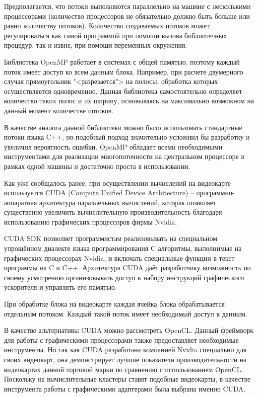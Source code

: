 \documentclass[a4paper, 14pt]{extarticle}
\theoremstyle{definition}
\begin{document}
\par Предполагается, что потоки выполняются параллельно на машине с несколькими процессорами (количество процессоров не обязательно должно быть больше или равно количеству потоков). Количество создаваемых потоков может регулироваться как самой программой при помощи вызова библиотечных процедур, так и извне, при помощи переменных окружения.

\par Библиотека OpenMP работает в системах с общей памятью, поэтому каждый поток имеет доступ ко всем данным блока. Например, при расчете двумерного случая прямоугольник "<разрезается"> на полосы, обработка которых осуществляется одновременно. Данная библиотека самостоятельно определяет количество таких полос и их ширину, основываясь на максимально возможном на данный момент количестве потоков.

\par В качестве аналога данной библиотеки можно было использовать стандартные потоки языка C++, но подобный подход значительно усложнил бы разработку и увеличил вероятность ошибки. OpenMP обладает всеми необходимыми инструментами для реализации многопоточности на центральном процессоре в рамках одной машины и достаточно проста в использовании.

\par Как уже сообщалось ранее, при осуществлении вычислений на видеокарте используется CUDA (Compute Unified Device Architecture) -- программно-аппаратная архитектура параллельных вычислений, которая позволяет существенно увеличить вычислительную производительность благодаря использованию графических процессоров фирмы Nvidia.

\par CUDA SDK позволяет программистам реализовывать на специальном упрощённом диалекте языка программирования C алгоритмы, выполнимые на графических процессорах Nvidia, и включать специальные функции в текст программы на C и C++. Архитектура CUDA даёт разработчику возможность по своему усмотрению организовывать доступ к набору инструкций графического ускорителя и управлять его памятью.

\par При обработке блока на видеокарте каждая ячейка блока обрабатывается отдельным потоком. Каждый такой поток имеет необходимый доступ к данным.

\par В качестве альтернативы CUDA можно рассмотреть OpenCL. Данный фреймворк для работы с графическими процессорами также предоставляет необходимые инструменты. Но так как CUDA разработана компанией Nvidia специально для своих видеокарт, она демонстрирует лучшие показатели производительности на видеокартах данной торговой марки по сравнению с использованием OpenCL. Поскольку на вычислительные кластеры ставят подобные видеокарты, в качестве инструмента работы с графическими адаптерами была выбрана именно CUDA.
\end{document}
